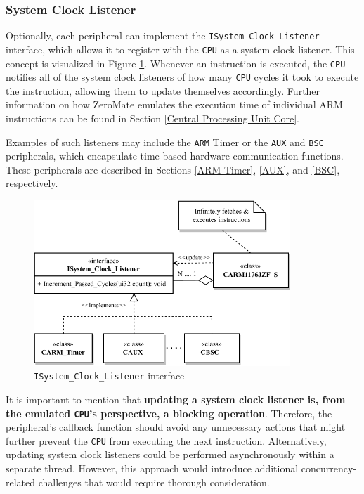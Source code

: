 \documentclass[english, ing, kiv, he, iso690numb, pdf]{fasthesis}
\begin{document}
	\subsubsection{System Clock Listener} \label{System Clock Listener}
	
	Optionally, each peripheral can implement the \texttt{ISystem\_Clock\_Listener} interface, which allows it to register with the \texttt{CPU} as a system clock listener. This concept is visualized in Figure \ref{ISystem_Clock_Listener interface}. Whenever an instruction is executed, the \texttt{CPU} notifies all of the system clock listeners of how many \texttt{CPU} cycles it took to execute the instruction, allowing them to update themselves accordingly. Further information on how ZeroMate emulates the execution time of individual ARM instructions can be found in Section \ref{Central Processing Unit Core}.
	
	Examples of such listeners may include the \texttt{ARM} Timer or the \texttt{AUX} and \texttt{BSC} peripherals, which encapsulate time-based hardware communication functions. These peripherals are described in Sections \ref{ARM Timer}, \ref{AUX}, and  \ref{BSC}, respectively.
	
	\begin{figure}[ht]
		\centering
		\includegraphics[width=0.86\textwidth]{img/diagrams/system_clock_listener.pdf}
		\caption{\texttt{ISystem\_Clock\_Listener} interface}
		\label{ISystem_Clock_Listener interface}
	\end{figure}
	
	It is important to mention that \textbf{updating a system clock listener is, from the emulated \texttt{CPU}'s perspective, a blocking operation}. Therefore, the peripheral's callback function should avoid any unnecessary actions that might further prevent the \texttt{CPU} from executing the next instruction. Alternatively, updating system clock listeners could be performed asynchronously within a separate thread. However, this approach would introduce additional concurrency-related challenges that would require thorough consideration.
	
\end{document}
